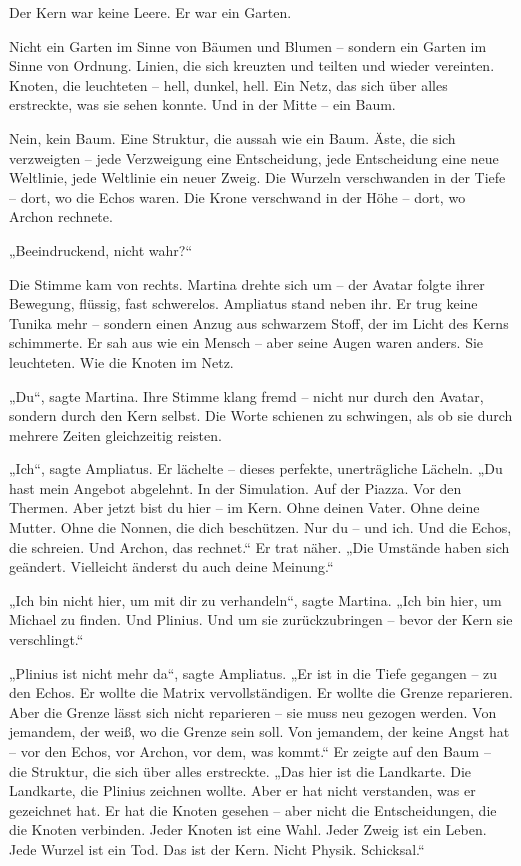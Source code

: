 \documentclass[
]{article}
\begin{document}
Der Kern war keine Leere. Er war ein Garten.

Nicht ein Garten im Sinne von Bäumen und Blumen -- sondern ein Garten im Sinne von Ordnung. Linien, die sich kreuzten und teilten und wieder vereinten. Knoten, die leuchteten -- hell, dunkel, hell. Ein Netz, das sich über alles erstreckte, was sie sehen konnte. Und in der Mitte -- ein Baum.

Nein, kein Baum. Eine Struktur, die aussah wie ein Baum. Äste, die sich verzweigten -- jede Verzweigung eine Entscheidung, jede Entscheidung eine neue Weltlinie, jede Weltlinie ein neuer Zweig. Die Wurzeln verschwanden in der Tiefe -- dort, wo die Echos waren. Die Krone verschwand in der Höhe -- dort, wo Archon rechnete.

„Beeindruckend, nicht wahr?{\kern0pt}``

Die Stimme kam von rechts. Martina drehte sich um -- der Avatar folgte ihrer Bewegung, flüssig, fast schwerelos. Ampliatus stand neben ihr. Er trug keine Tunika mehr -- sondern einen Anzug aus schwarzem Stoff, der im Licht des Kerns schimmerte. Er sah aus wie ein Mensch -- aber seine Augen waren anders. Sie leuchteten. Wie die Knoten im Netz.

„Du``, sagte Martina. Ihre Stimme klang fremd -- nicht nur durch den Avatar, sondern durch den Kern selbst. Die Worte schienen zu schwingen, als ob sie durch mehrere Zeiten gleichzeitig reisten.

„Ich``, sagte Ampliatus. Er lächelte -- dieses perfekte, unerträgliche Lächeln. „Du hast mein Angebot abgelehnt. In der Simulation. Auf der Piazza. Vor den Thermen. Aber jetzt bist du hier -- im Kern. Ohne deinen Vater. Ohne deine Mutter. Ohne die Nonnen, die dich beschützen. Nur du -- und ich. Und die Echos, die schreien. Und Archon, das rechnet.`` Er trat näher. „Die Umstände haben sich geändert. Vielleicht änderst du auch deine Meinung.``

„Ich bin nicht hier, um mit dir zu verhandeln``, sagte Martina. „Ich bin hier, um Michael zu finden. Und Plinius. Und um sie zurückzubringen -- bevor der Kern sie verschlingt.``

„Plinius ist nicht mehr da``, sagte Ampliatus. „Er ist in die Tiefe gegangen -- zu den Echos. Er wollte die Matrix vervollständigen. Er wollte die Grenze reparieren. Aber die Grenze lässt sich nicht reparieren -- sie muss neu gezogen werden. Von jemandem, der weiß, wo die Grenze sein soll. Von jemandem, der keine Angst hat -- vor den Echos, vor Archon, vor dem, was kommt.`` Er zeigte auf den Baum -- die Struktur, die sich über alles erstreckte. „Das hier ist die Landkarte. Die Landkarte, die Plinius zeichnen wollte. Aber er hat nicht verstanden, was er gezeichnet hat. Er hat die Knoten gesehen -- aber nicht die Entscheidungen, die die Knoten verbinden. Jeder Knoten ist eine Wahl. Jeder Zweig ist ein Leben. Jede Wurzel ist ein Tod. Das ist der Kern. Nicht Physik. Schicksal.``
\end{document}
